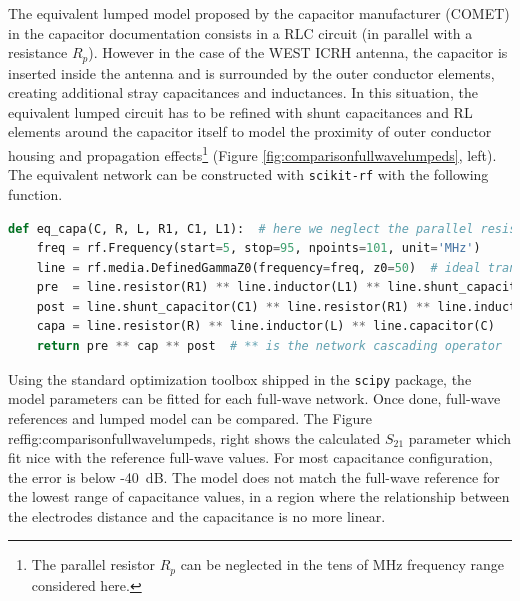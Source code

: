 \documentclass{aip-cp}
\begin{document}
The equivalent lumped model proposed by the capacitor manufacturer (COMET) in the capacitor documentation consists in a RLC circuit (in parallel with a resistance $R_p$).  
However in the case of the WEST ICRH antenna, the capacitor is inserted inside the antenna and is surrounded by the outer conductor elements, creating additional stray capacitances and inductances. 
In this situation, the equivalent lumped circuit has to be refined with shunt capacitances and RL elements around the capacitor itself to model the proximity of outer conductor housing and propagation effects\footnote{The parallel resistor $R_p$ can be neglected in the tens of MHz frequency range considered here.} (Figure \ref{fig:comparisonfullwavelumpeds}, left). The equivalent network can be constructed with \texttt{scikit-rf} with the following function. 

\begin{lstlisting}[language=Python]
def eq_capa(C, R, L, R1, C1, L1):  # here we neglect the parallel resistance R_p
	freq = rf.Frequency(start=5, stop=95, npoints=101, unit='MHz')
	line = rf.media.DefinedGammaZ0(frequency=freq, z0=50)  # ideal transmission line media
	pre  = line.resistor(R1) ** line.inductor(L1) ** line.shunt_capacitor(C1)
	post = line.shunt_capacitor(C1) ** line.resistor(R1) ** line.inductor(L1) 
	capa = line.resistor(R) ** line.inductor(L) ** line.capacitor(C)
	return pre ** cap ** post  # ** is the network cascading operator
\end{lstlisting}

Using the standard optimization toolbox shipped in the \texttt{scipy} package, the model parameters can be fitted for each full-wave network. Once done, full-wave references and lumped model can be compared. The Figure~\\ref{fig:comparisonfullwavelumpeds, right} shows the calculated $S_{21}$ parameter which fit nice with the reference full-wave values. For most capacitance configuration, the error is below -40~dB. The model does not match the full-wave reference for the lowest range of capacitance values, in a region where the relationship between the electrodes distance and the capacitance is no more linear.
\end{document}
